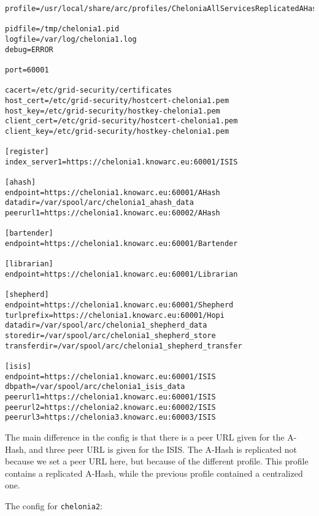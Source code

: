 \documentclass{article}
\begin{document}
\begin{verbatim}
profile=/usr/local/share/arc/profiles/CheloniaAllServicesReplicatedAHashWithISIS.xml

pidfile=/tmp/chelonia1.pid
logfile=/var/log/chelonia1.log
debug=ERROR

port=60001

cacert=/etc/grid-security/certificates
host_cert=/etc/grid-security/hostcert-chelonia1.pem
host_key=/etc/grid-security/hostkey-chelonia1.pem
client_cert=/etc/grid-security/hostcert-chelonia1.pem
client_key=/etc/grid-security/hostkey-chelonia1.pem

[register]
index_server1=https://chelonia1.knowarc.eu:60001/ISIS

[ahash]
endpoint=https://chelonia1.knowarc.eu:60001/AHash
datadir=/var/spool/arc/chelonia1_ahash_data
peerurl1=https://chelonia1.knowarc.eu:60002/AHash

[bartender]
endpoint=https://chelonia1.knowarc.eu:60001/Bartender

[librarian]
endpoint=https://chelonia1.knowarc.eu:60001/Librarian

[shepherd]
endpoint=https://chelonia1.knowarc.eu:60001/Shepherd
turlprefix=https://chelonia1.knowarc.eu:60001/Hopi
datadir=/var/spool/arc/chelonia1_shepherd_data
storedir=/var/spool/arc/chelonia1_shepherd_store
transferdir=/var/spool/arc/chelonia1_shepherd_transfer

[isis]
endpoint=https://chelonia1.knowarc.eu:60001/ISIS
dbpath=/var/spool/arc/chelonia1_isis_data
peerurl1=https://chelonia1.knowarc.eu:60001/ISIS
peerurl2=https://chelonia2.knowarc.eu:60002/ISIS
peerurl3=https://chelonia3.knowarc.eu:60003/ISIS
\end{verbatim}

The main difference in the config is that there is a peer URL given for the A-Hash, and three peer URL is given for the ISIS. The A-Hash is replicated not because we set a peer URL here, but because of the different profile. This profile contains a replicated A-Hash, while the previous profile contained a centralized one.

The config for \verb!chelonia2!:
\end{document}
